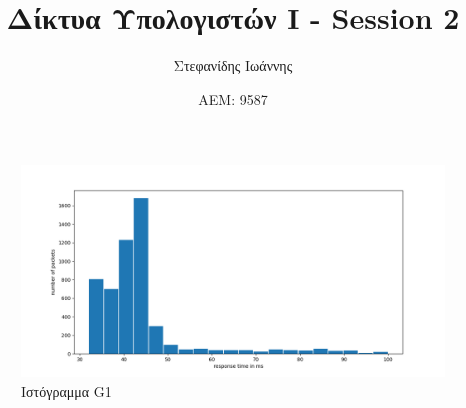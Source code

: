 \documentclass{article}
\title{Δίκτυα Υπολογιστών Ι - Session 2}
\author{Στεφανίδης Ιωάννης}
\date{ΑΕΜ: 9587}
\begin{document}
\maketitle

\begin{figure}[H]
  \centering
  \includegraphics[width=\textwidth]{G1.png}
  \caption{Ιστόγραμμα G1}
  \label{fig:G1}
\end{figure}
\end{document}
